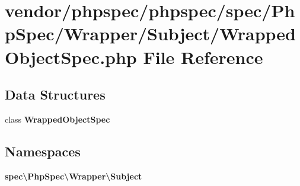 \section{vendor/phpspec/phpspec/spec/\+Php\+Spec/\+Wrapper/\+Subject/\+Wrapped\+Object\+Spec.php File Reference}
\label{_wrapped_object_spec_8php}
\subsection*{Data Structures}
\begin{DoxyCompactItemize}
\item 
class {\bf Wrapped\+Object\+Spec}
\end{DoxyCompactItemize}
\subsection*{Namespaces}
\begin{DoxyCompactItemize}
\item 
 {\bf spec\textbackslash{}\+Php\+Spec\textbackslash{}\+Wrapper\textbackslash{}\+Subject}
\end{DoxyCompactItemize}
